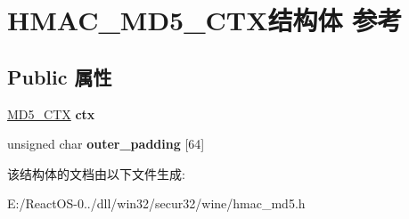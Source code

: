\hypertarget{struct_h_m_a_c___m_d5___c_t_x}{}\section{H\+M\+A\+C\+\_\+\+M\+D5\+\_\+\+C\+T\+X结构体 参考}
\label{struct_h_m_a_c___m_d5___c_t_x}
\subsection*{Public 属性}
\begin{DoxyCompactItemize}
\item 
\mbox{\label{struct_h_m_a_c___m_d5___c_t_x_a45175efad5deee1493dd089c2b5a8c6a}} 
\hyperlink{struct_m_d5___c_t_x}{M\+D5\+\_\+\+C\+TX} {\bfseries ctx}
\item 
\mbox{\label{struct_h_m_a_c___m_d5___c_t_x_a8c1b37b5ee510c72df684afd17929c09}} 
unsigned char {\bfseries outer\+\_\+padding} \mbox{[}64\mbox{]}
\end{DoxyCompactItemize}


该结构体的文档由以下文件生成\+:\begin{DoxyCompactItemize}
\item 
E\+:/\+React\+O\+S-\/0../dll/win32/secur32/wine/hmac\+\_\+md5.\+h\end{DoxyCompactItemize}
